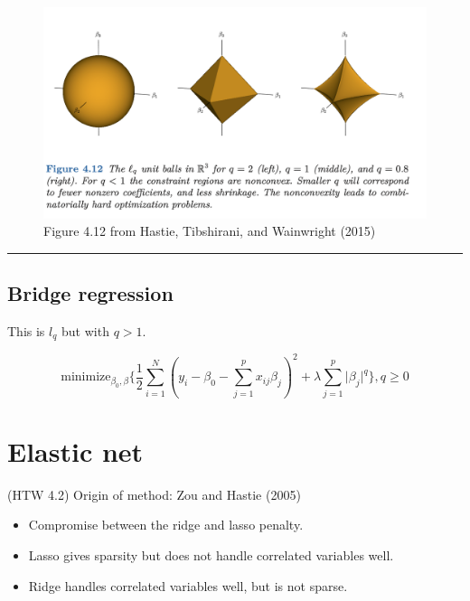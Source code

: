 \documentclass[
  letterpaper,
  DIV=11,
  numbers=noendperiod]{scrartcl}
\providecommand{\tightlist}{%
  \setlength{\itemsep}{0pt}\setlength{\parskip}{0pt}}\usepackage{longtable,booktabs,array}
\begin{document}
\begin{figure}

{\centering \includegraphics[width=1\textwidth,height=\textheight]{./HTWFig412.png}

}

\caption{Figure 4.12 from Hastie, Tibshirani, and Wainwright (2015)}

\end{figure}

\begin{center}\rule{0.5\linewidth}{0.5pt}\end{center}

\hypertarget{bridge-regression}{%
\subsection{Bridge regression}\label{bridge-regression}}

This is \(l_q\) but with \(q>1\).

\[ \text{minimize}_{\beta_0,\beta} \{ \frac{1}{2}\sum_{i=1}^N (y_i-\beta_0-\sum_{j=1}^p x_{ij}\beta_j )^2 + \lambda \sum_{j=1}^p \lvert \beta_j\rvert^q \}, q\ge 0\]

\hypertarget{elastic-net}{%
\section{Elastic net}\label{elastic-net}}

(HTW 4.2) Origin of method: Zou and Hastie (2005)

\begin{itemize}
\tightlist
\item
  Compromise between the ridge and lasso penalty.
\item
  Lasso gives sparsity but does not handle correlated variables well.
\item
  Ridge handles correlated variables well, but is not sparse.
\end{itemize}
\end{document}
